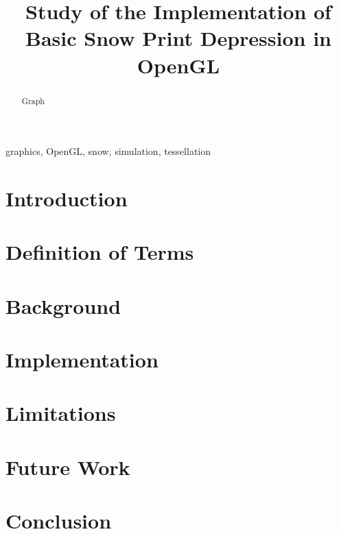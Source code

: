 \documentclass[conference]{IEEEtran}
\begin{document}
\title{Study of the Implementation of Basic Snow Print Depression in OpenGL}

\author{
\and
{}
}

\maketitle

\begin{abstract}
Graph
\end{abstract}

\begin{IEEEkeywords}
graphics, OpenGL, snow, simulation, tessellation
\end{IEEEkeywords}

\section{Introduction}


\section{Definition of Terms}


\section{Background}


\section{Implementation}


\section{Limitations}


\section{Future Work}


\section{Conclusion}


\printbibliography
\end{document}
